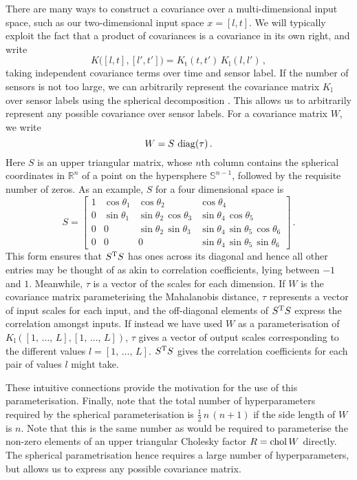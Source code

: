 \documentclass{acmtrans2m}
\newcommand{\Kl}[1]{K_{\text{#1}}}
\begin{document}
There are many ways to construct a covariance over a multi-dimensional input space, such as our two-dimensional input space $x=[l,t]$. We will typically exploit the fact that a product of covariances is a covariance in its own right, and write
 $$
K\big([l,t],[l',t']\big) =  \Kl{t}(t,t')\,\Kl{l}(l,l')\,,
$$
taking independent covariance terms over time and sensor label. If the number of sensors is not too large, we can arbitrarily represent the covariance matrix $\Kl{l}$ over sensor labels using the spherical decomposition \cite{PinheiroBates}. This allows us to arbitrarily represent any possible covariance over sensor labels. For a covariance matrix $W$, we write
\begin{equation} \label{eq:spherical_W}
 W={S}\,\operatorname{diag}({\tau})\,.
\end{equation}
Here ${S}$ is an upper triangular matrix, whose $n$th column contains the spherical coordinates in $\mathbb{R}^n$ of a point on the hypersphere $\mathbb{S}^{n-1}$, followed by the requisite number of zeros. As an example, $S$ for a four dimensional space is
\begin{equation} \label{eq:spherical}
 S=\left[ \begin{array}{llll}
1 & \cos{\theta_1} 	& \cos{\theta_2} 			& \cos{\theta_4} \\
0 & \sin{\theta_1} 	& \sin{\theta_2}\,\cos{\theta_3} 	& \sin{\theta_4}\,\cos{\theta_5} \\
0 & 0 			& \sin{\theta_2}\,\sin{\theta_3} 	& \sin{\theta_4}\,\sin{\theta_5}\,\cos{\theta_6} \\
0 & 0 			& 0				 	& \sin{\theta_4}\,\sin{\theta_5}\,\sin{\theta_6} 
   \end{array} \right]\,.
\end{equation}
This form ensures that $S^{\mathrm{T}} S$ has ones across its diagonal and hence all other entries may be thought of as akin to correlation coefficients, lying between $-1$ and $1$. Meanwhile, ${\tau}$ is a vector of the scales for each dimension. If $W$ is the covariance matrix parameterising the Mahalanobis distance, $\tau$ represents a vector of input scales for each input, and the off-diagonal elements of $S^{\mathrm{T}} S$ express the correlation amongst inputs. If instead we have used $W$ as a parameterisation of $\Kl{l}([1,\,\ldots,\,L],[1,\,\ldots,\,L])$, $\tau$ gives a vector of output scales corresponding to the different values $l=[1,\,\ldots,\,L]$. $S^{\mathrm{T}} S$ gives the correlation coefficients for each pair of values $l$ might take.

These intuitive connections provide the motivation for the use of this parameterisation. Finally, note that the total number of hyperparameters required by the spherical parameterisation is $\frac{1}{2}\,n\,(n+1)$ if the side length of $W$ is $n$. Note that this is the same number as would be required to parameterise the non-zero elements of an upper triangular Cholesky factor $R=\operatorname{chol}{W}$ directly. The spherical parametrisation hence requires a large number of hyperparameters, but allows us to express any possible covariance matrix.
\end{document}
